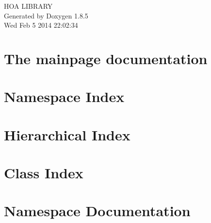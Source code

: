 \documentclass[twoside]{book}
\newcommand{\clearemptydoublepage}{%
  \newpage{\pagestyle{empty}\cleardoublepage}%
}
\begin{document}
\hypersetup{pageanchor=false}
\begin{titlepage}
\vspace*{7cm}
\begin{center}%
{\Large H\-O\-A L\-I\-B\-R\-A\-R\-Y }\\
\vspace*{1cm}
{\large Generated by Doxygen 1.8.5}\\
\vspace*{0.5cm}
{\small Wed Feb 5 2014 22:02:34}\\
\end{center}
\end{titlepage}
\clearemptydoublepage
\tableofcontents
\clearemptydoublepage
{}
\hypersetup{pageanchor=true}

\chapter{The mainpage documentation}
\label{index}\hypertarget{index}{}
\chapter{Namespace Index}

\chapter{Hierarchical Index}

\chapter{Class Index}

\chapter{Namespace Documentation}

\end{document}
